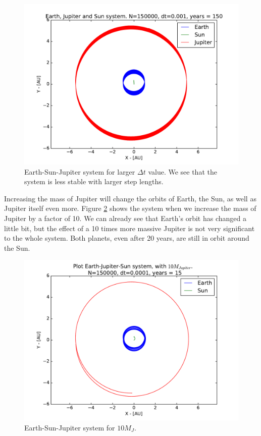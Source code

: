 \documentclass[12pt]{article}
\begin{document}
\begin{figure}[!h]
\centering
\includegraphics[width=\linewidth]{Plots/Earth_Sun_Jupiter_largerdt.pdf}
\caption{Earth-Sun-Jupiter system for larger $\Delta t$ value. We see that the system is less stable with larger step lengths.}
\label{fig:ESJ_stability}
\end{figure}

Increasing the mass of Jupiter will change the orbits of Earth, the Sun, as well as Jupiter itself even more. Figure \ref{ESJ_10MJ} shows the system when we increase the mass of Jupiter by a factor of 10. We can already see that Earth's orbit has changed a little bit, but the effect of a 10 times more massive Jupiter is not very significant to the whole system. Both planets, even after 20 years, are still in orbit around the Sun.
\begin{figure}[!h]
\centering
\includegraphics[width=\linewidth]{Plots/Earth_Sun_Jupiter_10MJ.pdf}
\caption{Earth-Sun-Jupiter system for $10M_J$.}
\label{ESJ_10MJ}
\end{figure}
\end{document}

